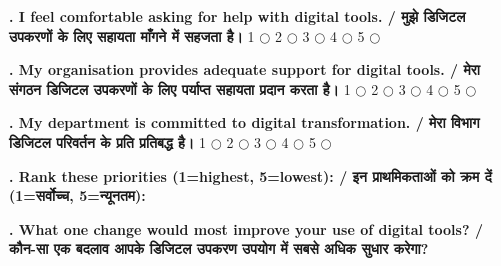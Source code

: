 \documentclass[11pt,a4paper]{article}
\newcounter{qcounter}
\begin{document}
\textbf{. I feel comfortable asking for help with digital tools. / मुझे डिजिटल उपकरणों के लिए सहायता माँगने में सहजता है।}
\vspace{0.1cm}
\vspace{0.1cm}
1 $\bigcirc$ \hspace{1cm} 2 $\bigcirc$ \hspace{1cm} 3 $\bigcirc$ \hspace{1cm} 4 $\bigcirc$ \hspace{1cm} 5 $\bigcirc$
\vspace{0.4cm}

\textbf{. My organisation provides adequate support for digital tools. / मेरा संगठन डिजिटल उपकरणों के लिए पर्याप्त सहायता प्रदान करता है।}
\vspace{0.1cm}
\vspace{0.1cm}
1 $\bigcirc$ \hspace{1cm} 2 $\bigcirc$ \hspace{1cm} 3 $\bigcirc$ \hspace{1cm} 4 $\bigcirc$ \hspace{1cm} 5 $\bigcirc$
\vspace{0.4cm}

\textbf{. My department is committed to digital transformation. / मेरा विभाग डिजिटल परिवर्तन के प्रति प्रतिबद्ध है।}
\vspace{0.1cm}
\vspace{0.1cm}
1 $\bigcirc$ \hspace{1cm} 2 $\bigcirc$ \hspace{1cm} 3 $\bigcirc$ \hspace{1cm} 4 $\bigcirc$ \hspace{1cm} 5 $\bigcirc$
\vspace{0.4cm}

\textbf{. Rank these priorities (1=highest, 5=lowest): / इन प्राथमिकताओं को क्रम दें (1=सर्वोच्च, 5=न्यूनतम):}
\vspace{0.1cm}
\vspace{0.2cm}
\hrulefill\par\vspace{0.6cm}\hrulefill\par\vspace{0.6cm}\hrulefill
\vspace{0.4cm}

\textbf{. What one change would most improve your use of digital tools? / कौन-सा एक बदलाव आपके डिजिटल उपकरण उपयोग में सबसे अधिक सुधार करेगा?}
\vspace{0.1cm}
\vspace{0.2cm}
\hrulefill\par\vspace{0.6cm}\hrulefill\par\vspace{0.6cm}\hrulefill
\vspace{0.4cm}
\end{document}
